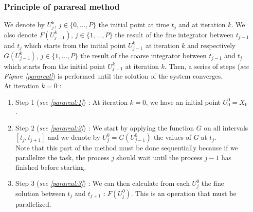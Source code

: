 \subsubsection{Principle of parareal method}
\label{section parareal method}

\noindent We denote by $U_j^k$, $j\in\{0,\dots,P\}$ the initial point at time $t_j$ and at iteration $k$. We also denote $F(U_{j-1}^k)$, $j\in\{1,\dots,P\}$ the result of the fine integrator between $t_{j-1}$ and $t_j$ which starts from the initial point $U_{j-1}^k$ at iteration $k$ and respectively $G(U_{j-1}^k)$, $j\in\{1,\dots,P\}$ the result of the coarse integrator between $t_{j-1}$ and $t_j$ which starts from the initial point $U_{j-1}^k$ at iteration $k$. Then, a series of steps (\textit{see Figure \ref{parareal}}) is performed until the solution of the system converges. \\

\noindent At iteration $k=0$ :
\begin{enumerate}[label=\textbullet]	
	\item Step 1 (\textit{see \ref{parareal:1}}) : At iteration $k=0$, we have an initial point $U_0^0=X_0$.
	\item Step 2 (\textit{see \ref{parareal:2}}) : We start by applying the function $G$ on all intervals $[t_j,t_{j+1}]$ and we denote by $U_j^0=G(U_{j-1}^0)$ the values of $G$ at $t_j$. \\
	Note that this part of the method must be done sequentially because if we parallelize the task, the process $j$ should wait until the process $j-1$ has finished before starting.
	\item Step 3 (\textit{see \ref{parareal:3}}) : We can then calculate from each $U_j^0$ the fine solution between $t_j$ and $t_{j+1}$ : $F(U_j^0)$. This is an operation that must be parallelized.
\end{enumerate}

